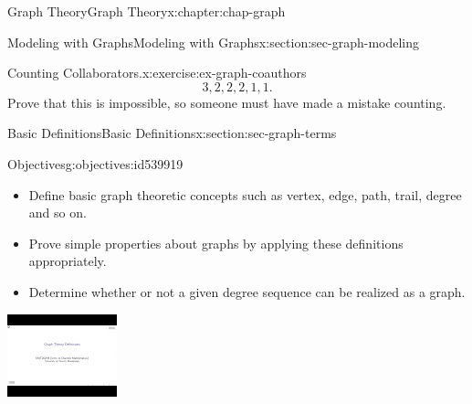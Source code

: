 \documentclass[oneside,10pt,]{book}
\numberwithin{equation}{section}
\newlength{\qrsize}
\newlength{\previewwidth}
\begin{document}
\begin{chapterptx}{Graph Theory}{}{Graph Theory}{}{}{x:chapter:chap-graph}
\begin{sectionptx}{Modeling with Graphs}{}{Modeling with Graphs}{}{}{x:section:sec-graph-modeling}
\begin{inlineexercise}{Counting Collaborators.}{x:exercise:ex-graph-coauthors}
\begin{equation*}
3,2,2,2,1,1\text{.}
\end{equation*}
Prove that this is impossible, so someone must have made a mistake counting.%
\end{inlineexercise}%
\end{sectionptx}
%
%
\typeout{************************************************}
\typeout{************************************************}
%
\begin{sectionptx}{Basic Definitions}{}{Basic Definitions}{}{}{x:section:sec-graph-terms}
\begin{objectives}{Objectives}{g:objectives:id539919}
%
\begin{itemize}[label=\textbullet]
\item{}Define basic graph theoretic concepts such as vertex, edge, path, trail, degree and so on.%
\item{}Prove simple properties about graphs by applying these definitions appropriately.%
\item{}Determine whether or not a given degree sequence can be realized as a graph.%
\end{itemize}
\end{objectives}
\begin{sidebyside}{1}{0}{0}{0}%
\begin{sbspanel}{1}%
\setlength{\qrsize}{9em}
\setlength{\previewwidth}{\linewidth}
\addtolength{\previewwidth}{-\qrsize}
\begin{tcbraster}[raster columns=2, raster column skip=1pt, raster halign=center, raster force size=false, raster left skip=0pt, raster right skip=0pt]%
\begin{tcolorbox}[previewstyle, width=\previewwidth]%
\includegraphics[width=0.80\linewidth,height=\qrsize,keepaspectratio]{images/video-graph-theory-defs.jpg}%

\end{tcolorbox}
\end{tcbraster}
\end{sbspanel}
\end{sidebyside}
\end{sectionptx}
\end{chapterptx}
\end{document}

